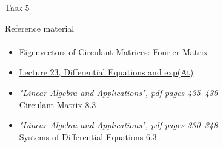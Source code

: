 \documentclass[aspectratio=169]{beamer}
\newcommand{\fbckg}[1]{\usebackgroundtemplate{\texttt{[image: \#1]}}}%
\begin{document}
\begin{frame}[t]{Task 5}
{\begin{enumerate}
        \end{enumerate}
    }
\end{frame}

\begin{frame}[t]{Reference material}
    \framesubtitle{}
    \Large
    \begin{itemize}
        \item \href{https://youtu.be/1pFv7e9xtHo}{Eigenvectors of Circulant Matrices: Fourier Matrix} \label{itm:circulant}
        \item \href{https://www.youtube.com/watch?v=IZqwi0wJovM&list=PL49CF3715CB9EF31D&index=23}{Lecture 23, Differential Equations and exp(At)}
        \item \textit{"Linear Algebra and Applications", pdf pages 435--436 }\\ Circulant Matrix 8.3
        \item \textit{"Linear Algebra and Applications", pdf pages 330--348 }\\ Systems of Differential Equations 6.3
    \end{itemize}
\end{frame}

\fbckg{fibeamer/figs/last_page.png}
\frame[plain]{}
\end{document}
